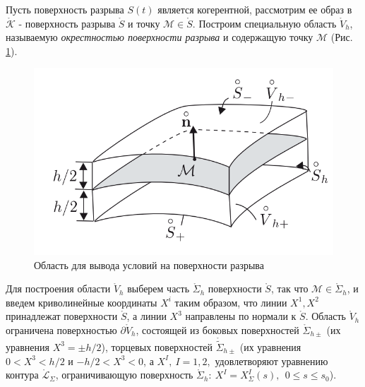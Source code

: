 

Пусть поверхность разрыва $S(t)$ является когерентной, рассмотрим ее образ в $\mathring{\mathcal{K}}$ - поверхность разрыва $\mathring{S}$ и точку $\mathcal{M}\in\mathring{S}$. Построим специальную область $\mathring{V}_h$, называемую \textit{окрестностью поверхности разрыва} и содержащую точку $\mathcal{M}$ (Рис. \ref{risun}). 


\begin{figure}[h!]
	\centering
	\includegraphics[width=0.7\linewidth]{semester8/img/screenshot001}
	\caption{Область для вывода условий на поверхности разрыва}
	\label{risun}
\end{figure}

Для построения области $\mathring{V}_h$	выберем часть $\mathring{\Sigma}_h$ поверхности $\mathring{S}$, так что $\mathcal{M}\in\mathring{\Sigma}_h$, и введем криволинейные координаты $X^i$ таким образом, что линии $X^1,X^2$ принадлежат поверхности $\mathring{S}$, а линии $X^3$ направлены по нормали к $\mathring{S}$. Область $\mathring{V}_h$ ограничена поверхностью $\partial\mathring{V}_h$, состоящей из боковых поверхностей $\mathring{\Sigma}_{h\pm}$ (их уравнения $X^3=\pm h/2$), торцевых поверхностей $\mathring{\tilde{\Sigma}}_{h\pm}$ (их уравнения $0 < X^3 < h/2$ и $-h/2 < X^3 < 0$, а $X^I,~I=1,2,$ удовлетворяют уравнению контура $\mathring{\mathcal{L}}_\Sigma$, ограничивающую поверхность $\mathring{\Sigma}_h:~X^I=X^I_\Sigma(s),~~0\le s\le s_0$).

